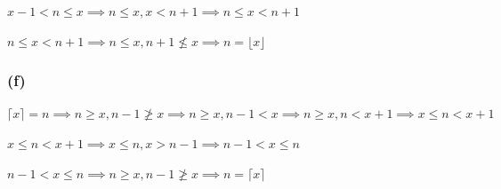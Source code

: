 \documentclass{article}
\begin{document}
$x-1 < n \leq x \implies n \leq x, x < n + 1 \implies n \leq x < n + 1$

$n \leq x < n + 1 \implies n \leq x, n+1 \nleq x \implies n = \lfloor x \rfloor$

\subsubsection*{(f)}

$\lceil x \rceil = n \implies n \geq x, n - 1 \ngeq x \implies n \geq x, n - 1 < x \implies n \geq x, n < x + 1 \implies x \leq n < x + 1$

$x \leq n < x + 1 \implies x \leq n, x > n - 1 \implies n - 1 < x \leq n$

$n - 1 < x \leq n \implies n \geq x, n-1 \ngeq x \implies n = \lceil x \rceil$
\end{document}
